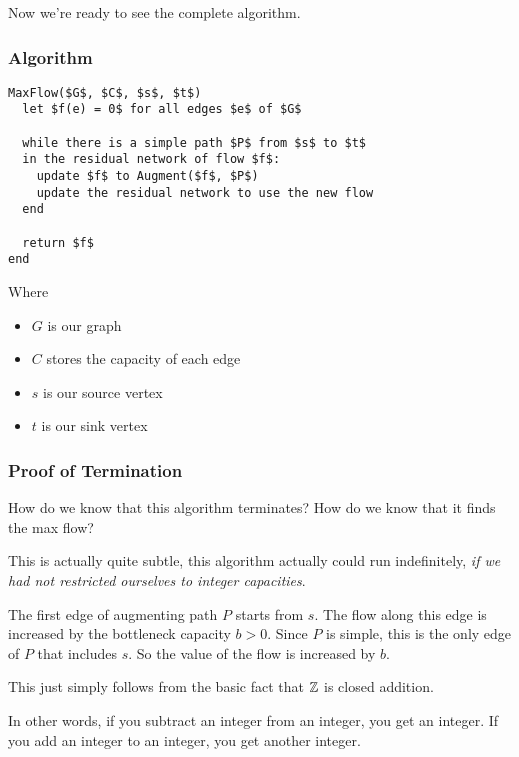 \documentclass[12pt]{article}
\begin{document}
  Now we're ready to see the complete algorithm.

  \subsubsection{Algorithm}

  \begin{lstlisting}
MaxFlow($G$, $C$, $s$, $t$)
  let $f(e) = 0$ for all edges $e$ of $G$

  while there is a simple path $P$ from $s$ to $t$
  in the residual network of flow $f$:
    update $f$ to Augment($f$, $P$)
    update the residual network to use the new flow
  end

  return $f$
end
  \end{lstlisting}

  Where
  \begin{itemize}
    \item $G$ is our graph
    \item $C$ stores the capacity of each edge
    \item $s$ is our source vertex
    \item $t$ is our sink vertex
  \end{itemize}

  \subsubsection{Proof of Termination}

  How do we know that this algorithm terminates? How do we know that it finds
  the max flow?

  This is actually quite subtle, this algorithm actually could run indefinitely,
  {\it if we had not restricted ourselves to integer capacities}.

  {
    The first edge of augmenting path $P$ starts from $s$. The flow along this
    edge is increased by the bottleneck capacity $b > 0$. Since $P$ is simple,
    this is the only edge of $P$ that includes $s$. So the value of the flow is
    increased by $b$.
  }

  {
    This just simply follows from the basic fact that ${\mathbb Z}$ is closed addition.

    In other words, if you subtract an integer from an integer, you get an
    integer. If you add an integer to an integer, you get another integer.
  }
\end{document}

